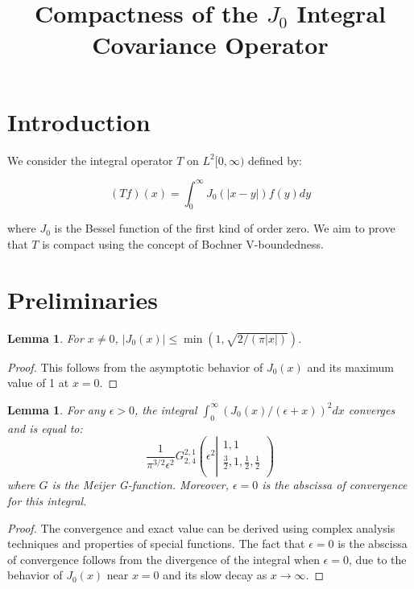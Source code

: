 \documentclass{article}
\title{Compactness of the $J_0$ Integral Covariance Operator}
\author{}
\date{}
\newtheorem{lemma}[theorem]{Lemma}
\begin{document}
\maketitle

\section{Introduction}

We consider the integral operator $T$ on $L^2[0,\infty)$ defined by:

\[(Tf)(x) = \int_0^\infty J_0(|x-y|)f(y)dy\]

where $J_0$ is the Bessel function of the first kind of order zero. We aim to prove that $T$ is compact using the concept of Bochner V-boundedness.

\section{Preliminaries}

\begin{lemma}
For $x \neq 0$, $|J_0(x)| \leq \min(1, \sqrt{2/(\pi|x|)})$.
\end{lemma}

\begin{proof}
This follows from the asymptotic behavior of $J_0(x)$ and its maximum value of 1 at $x = 0$.
\end{proof}

\begin{lemma}
\label{lem:integral}
For any $\epsilon > 0$, the integral $\int_0^\infty (J_0(x)/(\epsilon + x))^2 dx$ converges and is equal to:
\[\frac{1}{\pi^{3/2}\epsilon^2} G_{2,4}^{2,1}\left({\epsilon^2}\left|
\begin{array}{c}
 1,1 \\
 \frac{3}{2},1,\frac{1}{2},\frac{1}{2} \\
\end{array}
\right.\right)\]
where $G$ is the Meijer G-function. Moreover, $\epsilon = 0$ is the abscissa of convergence for this integral.
\end{lemma}

\begin{proof}
The convergence and exact value can be derived using complex analysis techniques and properties of special functions. The fact that $\epsilon = 0$ is the abscissa of convergence follows from the divergence of the integral when $\epsilon = 0$, due to the behavior of $J_0(x)$ near $x = 0$ and its slow decay as $x \to \infty$.
\end{proof}
\end{document}
